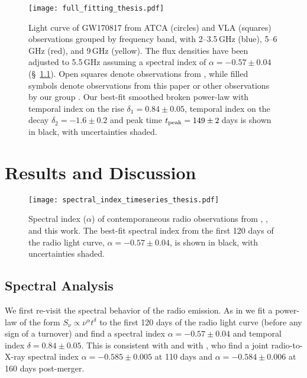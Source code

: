 \begin{figure*}
\texttt{[image: full\_fitting\_thesis.pdf]}
\caption[Radio lightcurve of GW170817 spanning the first 200 days post-merger]{Light curve of GW170817 from ATCA (circles) and VLA (squares) observations grouped by frequency band, with 2--3.5\,GHz (blue), 5--6\,GHz (red), and 9\,GHz (yellow). The flux densities have been adjusted to 5.5\,GHz assuming a spectral index of $\alpha=-0.57\pm 0.04$ (\S~\ref{sec:spectral}). Open squares denote observations from \citet{2018ApJ...856L..18M}, while filled symbols denote observations from this paper or other observations by our group \citep{2017Sci...358.1579H,2018Natur.554..207M}. Our best-fit smoothed broken power-law with temporal index on the rise $\delta_1=0.84\pm 0.05$, temporal index on the decay $\delta_2=-1.6\pm0.2$ and peak time $t_{\rm peak}=149\pm 2$\,days is shown in black, with uncertainties shaded.\label{fig:fitting}}
\end{figure*}



\section{Results and Discussion} \label{sec:results}

\begin{figure}
\texttt{[image: spectral\_index\_timeseries\_thesis.pdf]}
\caption[Radio spectral index of the afterglow of GW170817 across the first 200 days]{Spectral index ($\alpha$) of contemporaneous radio observations from \citet{2017Sci...358.1579H}, \citet{2018Natur.554..207M}, \citet{2018ApJ...856L..18M} and this work. The best-fit spectral index from the first 120 days of the radio light curve, $\alpha=-0.57\pm 0.04$, is shown in black, with uncertainties shaded.\label{fig:alpha_timeseries}}
\end{figure}

\subsection{Spectral Analysis}
\label{sec:spectral}
We first re-visit the spectral behavior of the radio emission.
As in \citet{2018Natur.554..207M} we fit a power-law of the form $S_\nu \propto \nu^{\alpha}t^{\delta}$ to the first 120 days of the radio light curve (before any sign of a turnover) and find a spectral index $\alpha=-0.57\pm 0.04$ and temporal index $\delta=0.84\pm0.05$. This is consistent with \citet{2018Natur.554..207M} and with \citet{2018ApJ...856L..18M}, who find a joint radio-to-X-ray spectral index $\alpha=-0.585\pm0.005$ at 110 days and $\alpha=-0.584\pm0.006$ at 160 days post-merger.

